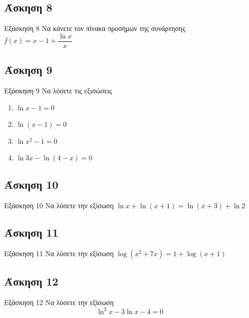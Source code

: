 \documentclass[greek]{beamer}
\begin{document}
\subsection{Άσκηση 8}
\begin{frame}[label=Άσκηση8,t]{Εξάσκηση 8}
 Να κάνετε τον πίνακα προσήμων της συνάρτησης $f(x)=x-1+\dfrac{\ln x}{x}$

\end{frame}

\subsection{Άσκηση 9}
\begin{frame}[label=Άσκηση9,t]{Εξάσκηση 9}
 Να λύσετε τις εξισώσεις
 \begin{enumerate}
  \item<1-> $\ln x-1=0$
  \item<2-> $\ln (x-1)=0$
  \item<3-> $\ln x^2-1=0$
  \item<4-> $\ln 3x-\ln(4-x)=0$
 \end{enumerate}

\end{frame}

\subsection{Άσκηση 10}
\begin{frame}[label=Άσκηση10,t]{Εξάσκηση 10}
 Να λύσετε την εξίσωση $\ln x+\ln (x+1)=\ln (x+3)+\ln 2$

\end{frame}

\subsection{Άσκηση 11}
\begin{frame}[label=Άσκηση11,t]{Εξάσκηση 11}
 Να λύσετε την εξίσωση $\log (x^2+7x)=1+\log (x+1)$

\end{frame}

\subsection{Άσκηση 12}
\begin{frame}[label=Άσκηση12,t]{Εξάσκηση 12}
 Να λύσετε την εξίσωση $$\ln^2x-3\ln x-4=0$$

\end{frame}
\end{document}
